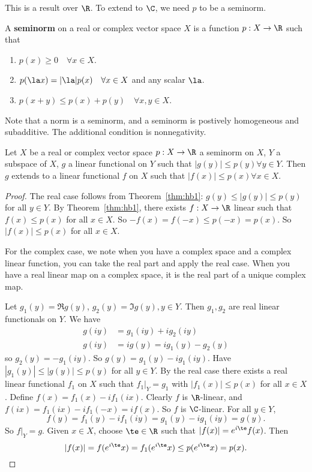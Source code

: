 This is a result over $\R$. To extend to $\C$, we need $p$ to be a seminorm.
\begin{df}
A \textbf{seminorm} on a real or complex vector space $X$ is a function $p:X\to \R$ such that
\begin{enumerate}
\item
$p(x)\ge 0\quad\forall x\in X$.
\item
$p(\la x)=|\la|p(x)\quad \forall x\in X$ and any scalar $\la$.
\item
$p(x+y)\le p(x)+p(y)\quad\forall x,y\in X$.
\end{enumerate}
\end{df}
Note that a norm is a seminorm, and a seminorm is postively homogeneous and subadditive. The additional condition is nonnegativity.
\begin{thm}
Let $X$ be a real or complex vector space $p:X\to \R$ a seminorm on $X$, $Y$ a subspace of $X$, $g$ a linear functional on $Y$ such that $|g(y)|\le p(y)\forall y\in Y$. Then $g$ extends to a linear functional $f$ on $X$ such that $|f(x)|\le p(x)\forall x\in X$.
\end{thm}
\begin{proof}
The real case follows from Theorem~\ref{thm:hb1}: $g(y)\le |g(y)|\le p(y)$ for all $y\in Y$. By Theorem~\ref{thm:hb1}, there exists $f:X\to \R$ linear such that $f(x)\le p(x)$ for all $x\in X$. So $-f(x)=f(-x)\le p(-x)=p(x)$. So $|f(x)|\le p(x)$ for all $x\in X$.

For the complex case, we note when you have a complex space and a complex linear function, you can take the real part and apply the real case. When you have a real linear map on a complex space, it is the real part of a unique complex map.

Let $g_1(y)=\Re g(y)$, $g_2(y)=\Im g(y),y\in Y$. Then $g_1,g_2$ are real linear functionals on $Y$. We have
\begin{align*}
g(iy)&=g_1(iy)+ig_2(iy)\\
g(iy)&=ig(y)=ig_1(y)-g_2(y)
\end{align*}
so $g_2(y)=-g_1(iy)$. So $g(y)=g_1(y)-ig_1(iy)$. Have $|g_1(y)|\le |g(y)|\le p(y)$ for all $y\in Y$. By the real case there exists a real linear functional $f_1$ on $X$ such that $f_1|_Y=g_1$ with $|f_1(x)|\le p(x)$ for all $x\in X$. Define $f(x)=f_1(x)-if_1(ix)$. Clearly $f$ is $\R$-linear, and $f(ix)=f_1(ix)-if_1(-x)=if(x)$. So $f$ is $\C$-linear. 
For all $y\in Y$, 
\[
f(y)=f_1(y)-if_1(iy)=g_1(y)-ig_1(iy)=g(y).
\]
So $f|_Y=g$. Given $x\in X$, choose $\te\in \R$ such that $|f(x)|=e^{i\te}f(x)$. Then
\[
|f(x)|=f(e^{i\te}x) =f_1(e^{i\te}x)\le p(e^{i\te}x) =p(x).
\]
\end{proof}

